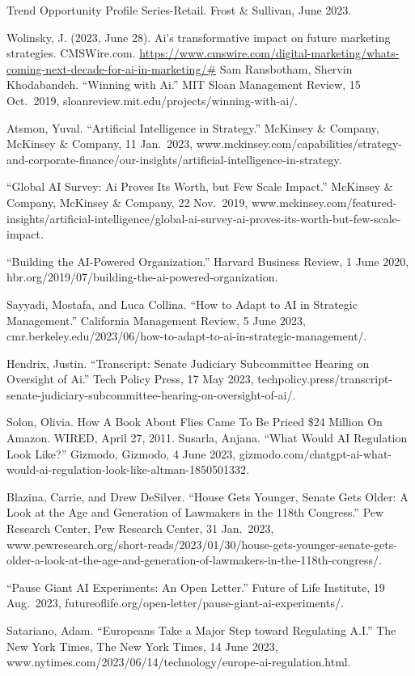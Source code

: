 \documentclass[
]{book}
\begin{document}
Trend Opportunity Profile Series-Retail. Frost \& Sullivan, June 2023.

Wolinsky, J. (2023, June 28). Ai's transformative impact on future marketing strategies. CMSWire.com. \url{https://www.cmswire.com/digital-marketing/whats-coming-next-decade-for-ai-in-marketing/\#}
Sam Ransbotham, Shervin Khodabandeh. ``Winning with Ai.'' MIT Sloan Management Review, 15 Oct.~2019, sloanreview.mit.edu/projects/winning-with-ai/.

Atsmon, Yuval. ``Artificial Intelligence in Strategy.'' McKinsey \& Company, McKinsey \& Company, 11 Jan.~2023, www.mckinsey.com/capabilities/strategy-and-corporate-finance/our-insights/artificial-intelligence-in-strategy.

``Global AI Survey: Ai Proves Its Worth, but Few Scale Impact.'' McKinsey \& Company, McKinsey \& Company, 22 Nov.~2019, www.mckinsey.com/featured-insights/artificial-intelligence/global-ai-survey-ai-proves-its-worth-but-few-scale-impact.

``Building the AI-Powered Organization.'' Harvard Business Review, 1 June 2020, hbr.org/2019/07/building-the-ai-powered-organization.

Sayyadi, Mostafa, and Luca Collina. ``How to Adapt to AI in Strategic Management.'' California Management Review, 5 June 2023, cmr.berkeley.edu/2023/06/how-to-adapt-to-ai-in-strategic-management/.

Hendrix, Justin. ``Transcript: Senate Judiciary Subcommittee Hearing on Oversight of Ai.'' Tech Policy Press, 17 May 2023, techpolicy.press/transcript-senate-judiciary-subcommittee-hearing-on-oversight-of-ai/.

Solon, Olivia. How A Book About Flies Came To Be Priced \$24 Million On Amazon. WIRED, April 27, 2011.
Susarla, Anjana. ``What Would AI Regulation Look Like?'' Gizmodo, Gizmodo, 4 June 2023, gizmodo.com/chatgpt-ai-what-would-ai-regulation-look-like-altman-1850501332.

Blazina, Carrie, and Drew DeSilver. ``House Gets Younger, Senate Gets Older: A Look at the Age and Generation of Lawmakers in the 118th Congress.'' Pew Research Center, Pew Research Center, 31 Jan.~2023, www.pewresearch.org/short-reads/2023/01/30/house-gets-younger-senate-gets-older-a-look-at-the-age-and-generation-of-lawmakers-in-the-118th-congress/.

``Pause Giant AI Experiments: An Open Letter.'' Future of Life Institute, 19 Aug.~2023, futureoflife.org/open-letter/pause-giant-ai-experiments/.

Satariano, Adam. ``Europeans Take a Major Step toward Regulating A.I.'' The New York Times, The New York Times, 14 June 2023, www.nytimes.com/2023/06/14/technology/europe-ai-regulation.html.
\end{document}
